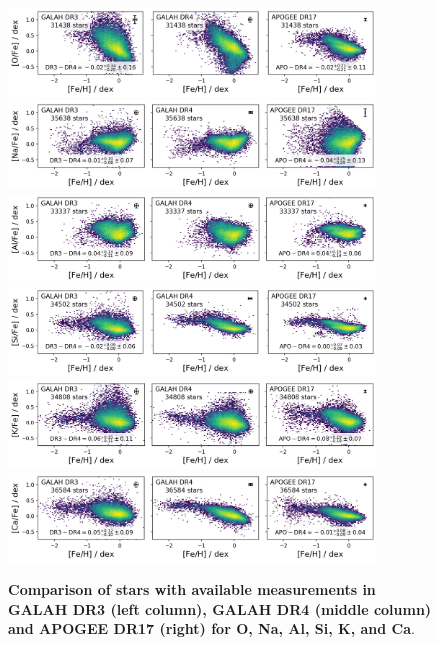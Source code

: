 \documentclass[
  journal=pasa,
  manuscript=research-paper, %
  year=2024,
  volume=37
]{cup-journal}
\begin{document}
\begin{figure}[ht]
 \centering
 \includegraphics[width=0.87\textwidth]{figures/comparison_dr4_dr3_apo17_O_fe.png}
 \includegraphics[width=0.87\textwidth]{figures/comparison_dr4_dr3_apo17_Na_fe.png}
 \includegraphics[width=0.87\textwidth]{figures/comparison_dr4_dr3_apo17_Al_fe.png}
 \includegraphics[width=0.87\textwidth]{figures/comparison_dr4_dr3_apo17_Si_fe.png}
 \includegraphics[width=0.87\textwidth]{figures/comparison_dr4_dr3_apo17_K_fe.png}
 \includegraphics[width=0.87\textwidth]{figures/comparison_dr4_dr3_apo17_Ca_fe.png}
 \caption{\textbf{Comparison of stars with available measurements in GALAH DR3 (left column), GALAH DR4 (middle column) and APOGEE DR17 (right) for O, Na, Al, Si, K, and Ca}.}
 \label{fig:comparison_dr3_dr4_apo17_rest}
\end{figure}
\end{document}
